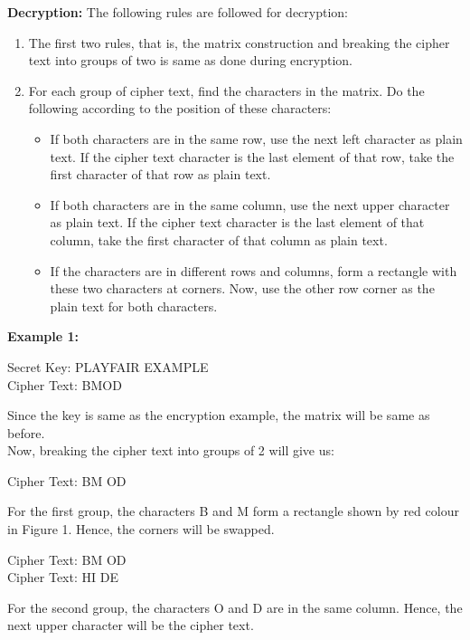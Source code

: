 \documentclass[11pt]{article}
\begin{document}
\textbf{Decryption:} The following rules are followed for decryption:
\begin{enumerate}
    \item The first two rules, that is, the matrix construction and breaking the cipher text into groups of two is same as done during encryption.
    \item For each group of cipher text, find the characters in the matrix. Do the following according to the position of these characters:
    \begin{itemize}
        \item If both characters are in the same row, use the next left character as plain text. If the cipher text character is the last element of that row,  take the first character of that row as plain text.
        \item If both characters are in the same column, use the next upper character as plain text. If the cipher text character is the last element of that column, take the first character of that column as plain text.
        \item If the characters are in different rows and columns, form a rectangle with these two characters at corners. Now, use the other row corner as the plain text for both characters.
    \end{itemize}
\end{enumerate}

\textbf{Example 1:}
\begin{center}
    Secret Key: PLAYFAIR EXAMPLE\\
    Cipher Text: BMOD\\
\end{center}
Since the key is same as the encryption example, the matrix will be same as before.\\
Now, breaking the cipher text into groups of 2 will give us:
\begin{center}
    Cipher Text: BM OD
\end{center}
For the first group, the characters B and M form a rectangle shown by red colour in Figure 1. Hence, the corners will be swapped.
\begin{center}
    Cipher Text: BM OD\\
    Cipher Text: HI DE
\end{center}
For the second group, the characters O and D are in the same column. Hence, the next upper character will be the cipher text.
\end{document}
